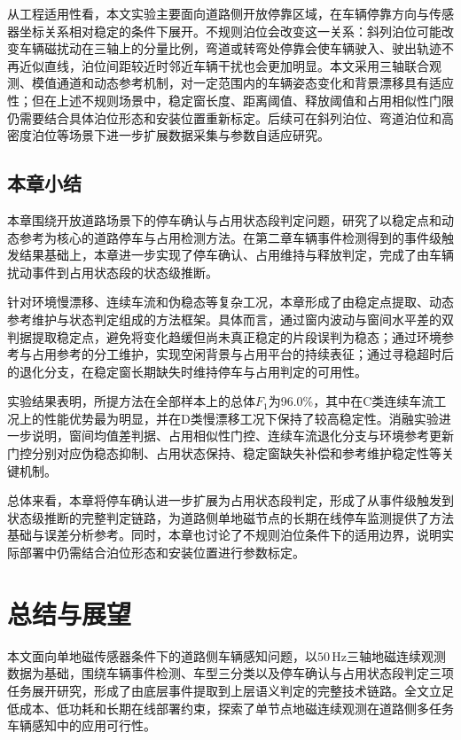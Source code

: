 \documentclass{xdupgthesis}
\begin{document}
从工程适用性看，本文实验主要面向道路侧开放停靠区域，在车辆停靠方向与传感器坐标关系相对稳定的条件下展开。不规则泊位会改变这一关系：斜列泊位可能改变车辆磁扰动在三轴上的分量比例，弯道或转弯处停靠会使车辆驶入、驶出轨迹不再近似直线，泊位间距较近时邻近车辆干扰也会更加明显。本文采用三轴联合观测、模值通道和动态参考机制，对一定范围内的车辆姿态变化和背景漂移具有适应性；但在上述不规则场景中，稳定窗长度、距离阈值、释放阈值和占用相似性门限仍需要结合具体泊位形态和安装位置重新标定。后续可在斜列泊位、弯道泊位和高密度泊位等场景下进一步扩展数据采集与参数自适应研究。

\section{本章小结}
\label{sec:ch4_summary}

本章围绕开放道路场景下的停车确认与占用状态段判定问题，研究了以稳定点和动态参考为核心的道路停车与占用检测方法。在第二章车辆事件检测得到的事件级触发结果基础上，本章进一步实现了停车确认、占用维持与释放判定，完成了由车辆扰动事件到占用状态段的状态级推断。

针对环境慢漂移、连续车流和伪稳态等复杂工况，本章形成了由稳定点提取、动态参考维护与状态判定组成的方法框架。具体而言，通过窗内波动与窗间水平差的双判据提取稳定点，避免将变化趋缓但尚未真正稳定的片段误判为稳态；通过环境参考与占用参考的分工维护，实现空闲背景与占用平台的持续表征；通过寻稳超时后的退化分支，在稳定窗长期缺失时维持停车与占用判定的可用性。

实验结果表明，所提方法在全部样本上的总体$F_1$为96.0\%，其中在C类连续车流工况上的性能优势最为明显，并在D类慢漂移工况下保持了较高稳定性。消融实验进一步说明，窗间均值差判据、占用相似性门控、连续车流退化分支与环境参考更新门控分别对应伪稳态抑制、占用状态保持、稳定窗缺失补偿和参考维护稳定性等关键机制。

总体来看，本章将停车确认进一步扩展为占用状态段判定，形成了从事件级触发到状态级推断的完整判定链路，为道路侧单地磁节点的长期在线停车监测提供了方法基础与误差分析参考。同时，本章也讨论了不规则泊位条件下的适用边界，说明实际部署中仍需结合泊位形态和安装位置进行参数标定。




\chapter{总结与展望}

本文面向单地磁传感器条件下的道路侧车辆感知问题，以$50\,\mathrm{Hz}$三轴地磁连续观测数据为基础，围绕车辆事件检测、车型三分类以及停车确认与占用状态段判定三项任务展开研究，形成了由底层事件提取到上层语义判定的完整技术链路。全文立足低成本、低功耗和长期在线部署约束，探索了单节点地磁连续观测在道路侧多任务车辆感知中的应用可行性。
\end{document}
